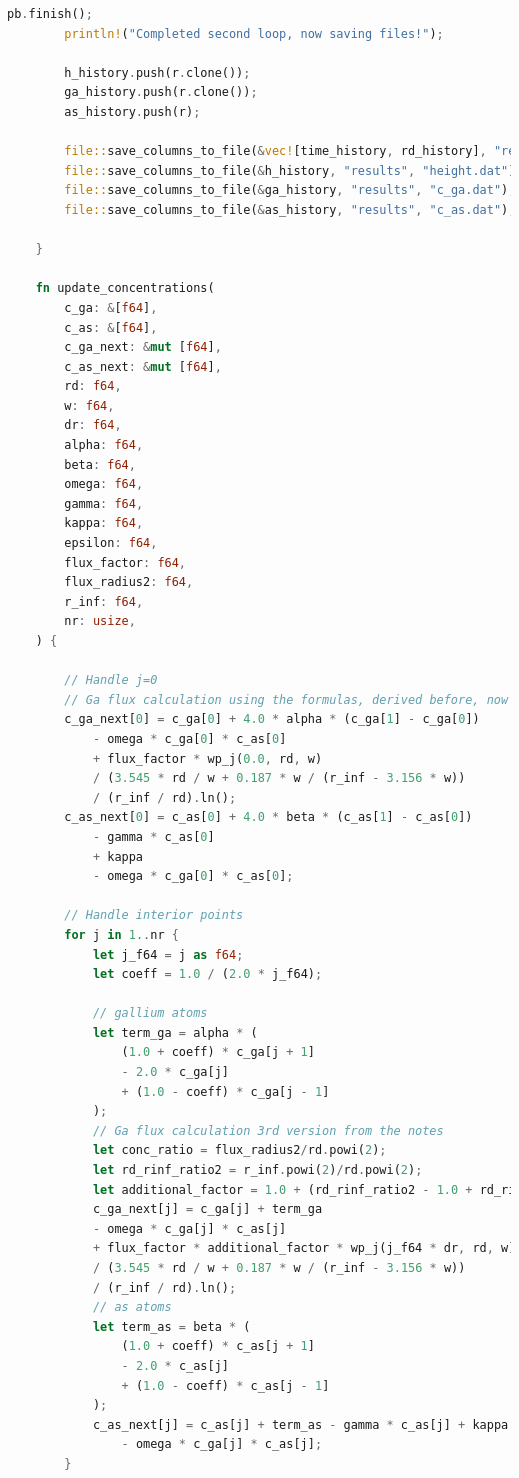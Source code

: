 \documentclass[14pt,oneside]{extarticle}
\begin{document}
\begin{lstlisting}[language=Rust]
        pb.finish();
        println!("Completed second loop, now saving files!");
    
        h_history.push(r.clone());
        ga_history.push(r.clone());
        as_history.push(r);
    
        file::save_columns_to_file(&vec![time_history, rd_history], "results", "droplet.dat");
        file::save_columns_to_file(&h_history, "results", "height.dat");
        file::save_columns_to_file(&ga_history, "results", "c_ga.dat");
        file::save_columns_to_file(&as_history, "results", "c_as.dat");
    
    }
    
    fn update_concentrations(
        c_ga: &[f64],
        c_as: &[f64],
        c_ga_next: &mut [f64],
        c_as_next: &mut [f64],
        rd: f64,
        w: f64,
        dr: f64,
        alpha: f64,
        beta: f64,
        omega: f64,
        gamma: f64,
        kappa: f64,
        epsilon: f64,
        flux_factor: f64,
        flux_radius2: f64,
        r_inf: f64,
        nr: usize,
    ) {
    
        // Handle j=0
        // Ga flux calculation using the formulas, derived before, now gives a correct result
        c_ga_next[0] = c_ga[0] + 4.0 * alpha * (c_ga[1] - c_ga[0])
            - omega * c_ga[0] * c_as[0]
            + flux_factor * wp_j(0.0, rd, w)
            / (3.545 * rd / w + 0.187 * w / (r_inf - 3.156 * w))
            / (r_inf / rd).ln();
        c_as_next[0] = c_as[0] + 4.0 * beta * (c_as[1] - c_as[0]) 
            - gamma * c_as[0] 
            + kappa 
            - omega * c_ga[0] * c_as[0];
    
        // Handle interior points
        for j in 1..nr {
            let j_f64 = j as f64;
            let coeff = 1.0 / (2.0 * j_f64);
            
            // gallium atoms
            let term_ga = alpha * (
                (1.0 + coeff) * c_ga[j + 1] 
                - 2.0 * c_ga[j] 
                + (1.0 - coeff) * c_ga[j - 1]
            );
            // Ga flux calculation 3rd version from the notes
            let conc_ratio = flux_radius2/rd.powi(2);
            let rd_rinf_ratio2 = r_inf.powi(2)/rd.powi(2);
            let additional_factor = 1.0 + (rd_rinf_ratio2 - 1.0 + rd_rinf_ratio2.ln())/conc_ratio;
            c_ga_next[j] = c_ga[j] + term_ga
            - omega * c_ga[j] * c_as[j]
            + flux_factor * additional_factor * wp_j(j_f64 * dr, rd, w)
            / (3.545 * rd / w + 0.187 * w / (r_inf - 3.156 * w))
            / (r_inf / rd).ln();
            // as atoms
            let term_as = beta * (
                (1.0 + coeff) * c_as[j + 1] 
                - 2.0 * c_as[j] 
                + (1.0 - coeff) * c_as[j - 1]
            );
            c_as_next[j] = c_as[j] + term_as - gamma * c_as[j] + kappa 
                - omega * c_ga[j] * c_as[j];
        }
    

\end{lstlisting}
\end{document}
